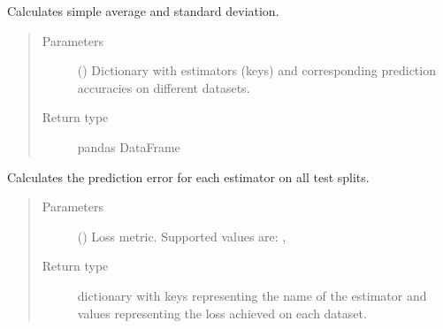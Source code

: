 \documentclass[letterpaper,10pt,english]{sphinxmanual}
\begin{document}
\begin{fulllineitems}
\begin{quote}
\begin{description}
\begin{itemize}
\end{itemize}

\end{description}\end{quote}

\begin{fulllineitems}
\label{\detokenize{analyze_results:mleap.analyze_results.analyze_results.AnalyseResults.calculate_average_std}}
Calculates simple average and standard deviation.
\begin{quote}\begin{description}
\item[{Parameters}] \leavevmode
{} () \textendash{} Dictionary with estimators (keys) and corresponding 
prediction accuracies on different datasets.

\item[{Return type}] \leavevmode
pandas DataFrame

\end{description}\end{quote}

\end{fulllineitems}


\begin{fulllineitems}
\label{\detokenize{analyze_results:mleap.analyze_results.analyze_results.AnalyseResults.calculate_error_all_datasets}}
Calculates the prediction error for each estimator on all test splits.
\begin{quote}\begin{description}
\item[{Parameters}] \leavevmode
{} () \textendash{} Loss metric. Supported values are: ,  

\item[{Return type}] \leavevmode
dictionary with keys representing the name of the estimator 
and values representing the loss achieved on each dataset.


\end{description}
\end{quote}
\end{fulllineitems}
\end{fulllineitems}
\end{document}
